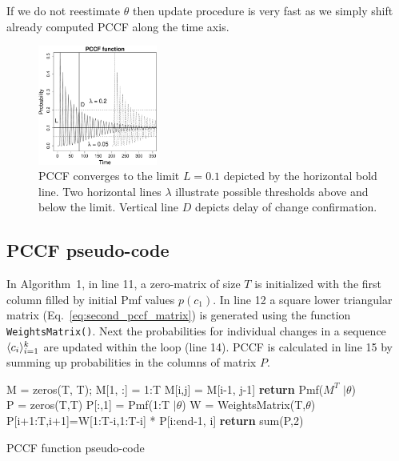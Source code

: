 If we do not reestimate $\theta$ then update procedure is very fast as we simply shift already computed PCCF along the time axis.
\begin{figure}[htb!]
\centering
\includegraphics[width=0.35\textwidth]{articles/pics/sdm_paper/PCCF.pdf}
\caption{PCCF converges to the limit $L = 0.1$ depicted by the horizontal bold line.
Two horizontal lines $\lambda$ illustrate possible thresholds above and below the limit.
Vertical line $D$ depicts delay of change confirmation.
}
\label{fig:conffunction}
\end{figure}


\subsection{PCCF pseudo-code}
\label{subsec:pccf_pseudo_code}
In Algorithm~1, in line 11,  a zero-matrix of size $T$ is initialized with the first column filled by initial Pmf values $p(c_1)$.
In line 12 a square lower triangular matrix (Eq.~\ref{eq:second_pccf_matrix}) is generated using the function {\tt WeightsMatrix()}.
Next the probabilities for individual changes in a sequence
$\langle  c_i  \rangle_{i=1}^k$
are updated within the loop (line 14).
PCCF is calculated in line 15 by summing up probabilities in the columns of matrix $P$.
\begin{algorithm}
    \label{alg:pccfalg}
\begin{algorithmic}[1]
    \State M = zeros(T, T);  M[1, :] = 1:T
			\State M[i,j] = M[i-1, j-1]
		\EndFor
	\EndFor
	\State \textbf{return} Pmf($M^T$ $| \theta$)
\EndFunction
\\
\State P = zeros(T,T)
\State P[:,1] = Pmf(1:T $| \theta$) 
\State W = WeightsMatrix(T,$\theta$)
	\State P[i+1:T,i+1]=W[1:T-i,1:T-i] * P[i:end-1, i]
\EndFor
\State \textbf{return} sum(P,2) 
\EndFunction
\end{algorithmic}
\caption{PCCF function pseudo-code}
\end{algorithm}


